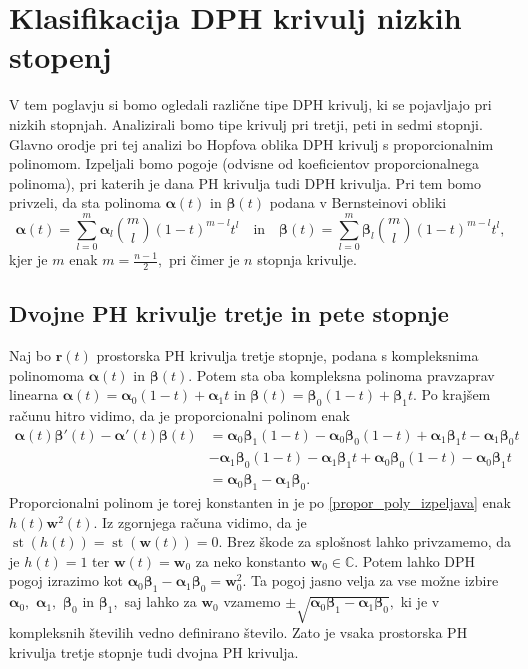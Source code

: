 \documentclass[12pt,a4paper,twoside]{article}
\theoremstyle{definition} %
\theoremstyle{plain} %
\numberwithin{equation}{section}  %
\renewcommand{\C}{\mathbb C}
\newcommand{\rV}{\mathbf{r}}
\newcommand{\wV}{\mathbf{w}}
\newcommand{\balpha}{\boldsymbol \alpha}
\newcommand{\bbeta}{\boldsymbol \beta}
\DeclareMathOperator{\st}{st}
\begin{document}

\section{Klasifikacija DPH krivulj nizkih stopenj}

V tem poglavju si bomo ogledali različne tipe DPH krivulj, ki se pojavljajo pri nizkih stopnjah. Analizirali bomo tipe krivulj pri tretji, peti in sedmi stopnji. Glavno orodje pri tej analizi bo Hopfova oblika DPH krivulj s proporcionalnim polinomom. Izpeljali bomo pogoje (odvisne od koeficientov proporcionalnega polinoma), pri katerih je dana PH krivulja tudi DPH krivulja. Pri tem bomo privzeli, da sta polinoma $\balpha(t)$ in $\bbeta(t)$ podana v Bernsteinovi obliki
\begin{equation*}
	\balpha(t)=\sum_{l=0}^m\balpha_l\binom{m}{l}(1-t)^{m-l}t^l\quad\text{in}\quad\bbeta(t)=\sum_{l=0}^m\bbeta_l\binom{m}{l}(1-t)^{m-l}t^l,
\end{equation*}
kjer je $m$ enak $m=\frac{n-1}{2},$ pri čimer je $n$ stopnja krivulje.

\subsection{Dvojne PH krivulje tretje in pete stopnje}

Naj bo $\rV(t)$ prostorska PH krivulja tretje stopnje, podana s kompleksnima polinomoma $\balpha(t)$ in $\bbeta(t).$ Potem sta oba kompleksna polinoma pravzaprav linearna $\balpha(t)=\balpha_0(1-t)+\balpha_1t$ in $\bbeta(t)=\bbeta_0(1-t)+\bbeta_1t.$ Po krajšem računu hitro vidimo, da je proporcionalni polinom enak
\begin{align*}
	\balpha(t)\bbeta'(t)-\balpha'(t)\bbeta(t)&=\balpha_0\bbeta_1(1-t)-\balpha_0\bbeta_0(1-t)+\balpha_1\bbeta_1t-\balpha_1\bbeta_0t\\
	&-\balpha_1\bbeta_0(1-t)-\balpha_1\bbeta_1t+\balpha_0\bbeta_0(1-t)-\balpha_0\bbeta_1t\\
	&=\balpha_0\bbeta_1-\balpha_1\bbeta_0.
\end{align*}
Proporcionalni polinom je torej konstanten in je po \eqref{propor_poly_izpeljava} enak $h(t)\wV^2(t).$ Iz zgornjega računa vidimo, da je $\st(h(t))=\st(\wV(t))=0.$ Brez škode za splošnost lahko privzamemo, da je $h(t)=1$ ter $\wV(t)=\wV_0$ za neko konstanto $\wV_0\in\C.$ Potem lahko DPH pogoj izrazimo kot $\balpha_0\bbeta_1-\balpha_1\bbeta_0=\wV_0^2.$ Ta pogoj jasno velja za vse možne izbire $\balpha_0,$ $\balpha_1,$ $\bbeta_0$ in $\bbeta_1,$ saj lahko za $\wV_0$ vzamemo $\pm\sqrt{\balpha_0\bbeta_1-\balpha_1\bbeta_0},$ ki je v kompleksnih številih vedno definirano število. Zato je vsaka prostorska PH krivulja tretje stopnje tudi dvojna PH krivulja.
\end{document}
